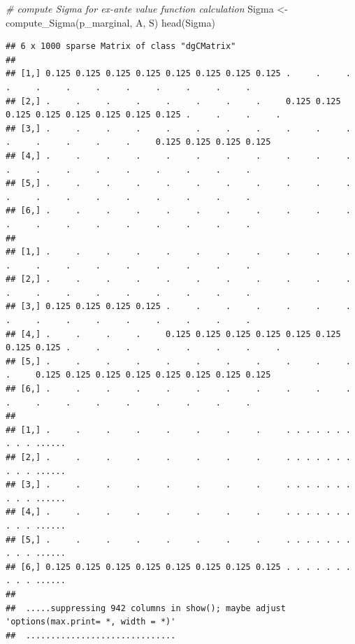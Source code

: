 \documentclass[
]{book}
\newenvironment{Shaded}{\begin{snugshade}}{\end{snugshade}}
\newcommand{\CommentTok}[1]{\textcolor[rgb]{0.56,0.35,0.01}{\textit{#1}}}
\newcommand{\FunctionTok}[1]{\textcolor[rgb]{0.00,0.00,0.00}{#1}}
\newcommand{\NormalTok}[1]{#1}
\newcommand{\OtherTok}[1]{\textcolor[rgb]{0.56,0.35,0.01}{#1}}
\begin{document}
\begin{Shaded}
\begin{Highlighting}[]
\CommentTok{\# compute Sigma for ex{-}ante value function calculation}
\NormalTok{Sigma }\OtherTok{\textless{}{-}} \FunctionTok{compute\_Sigma}\NormalTok{(p\_marginal, A, S)}
\FunctionTok{head}\NormalTok{(Sigma)}
\end{Highlighting}
\end{Shaded}

\begin{verbatim}
## 6 x 1000 sparse Matrix of class "dgCMatrix"
##                                                                                                                             
## [1,] 0.125 0.125 0.125 0.125 0.125 0.125 0.125 0.125 .     .     .     .     .     .     .     .     .     .     .     .    
## [2,] .     .     .     .     .     .     .     .     0.125 0.125 0.125 0.125 0.125 0.125 0.125 0.125 .     .     .     .    
## [3,] .     .     .     .     .     .     .     .     .     .     .     .     .     .     .     .     0.125 0.125 0.125 0.125
## [4,] .     .     .     .     .     .     .     .     .     .     .     .     .     .     .     .     .     .     .     .    
## [5,] .     .     .     .     .     .     .     .     .     .     .     .     .     .     .     .     .     .     .     .    
## [6,] .     .     .     .     .     .     .     .     .     .     .     .     .     .     .     .     .     .     .     .    
##                                                                                                                             
## [1,] .     .     .     .     .     .     .     .     .     .     .     .     .     .     .     .     .     .     .     .    
## [2,] .     .     .     .     .     .     .     .     .     .     .     .     .     .     .     .     .     .     .     .    
## [3,] 0.125 0.125 0.125 0.125 .     .     .     .     .     .     .     .     .     .     .     .     .     .     .     .    
## [4,] .     .     .     .     0.125 0.125 0.125 0.125 0.125 0.125 0.125 0.125 .     .     .     .     .     .     .     .    
## [5,] .     .     .     .     .     .     .     .     .     .     .     .     0.125 0.125 0.125 0.125 0.125 0.125 0.125 0.125
## [6,] .     .     .     .     .     .     .     .     .     .     .     .     .     .     .     .     .     .     .     .    
##                                                                                
## [1,] .     .     .     .     .     .     .     .     . . . . . . . . . . ......
## [2,] .     .     .     .     .     .     .     .     . . . . . . . . . . ......
## [3,] .     .     .     .     .     .     .     .     . . . . . . . . . . ......
## [4,] .     .     .     .     .     .     .     .     . . . . . . . . . . ......
## [5,] .     .     .     .     .     .     .     .     . . . . . . . . . . ......
## [6,] 0.125 0.125 0.125 0.125 0.125 0.125 0.125 0.125 . . . . . . . . . . ......
## 
##  .....suppressing 942 columns in show(); maybe adjust 'options(max.print= *, width = *)'
##  ..............................
\end{verbatim}
\end{document}
